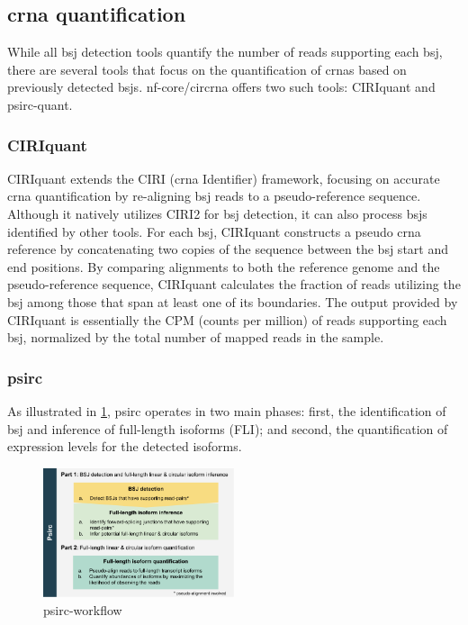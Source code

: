 \subsection{\gls{crna} quantification}
\label{sec:crna_quantification}

While all \gls{bsj} detection tools quantify the number of reads
supporting each \gls{bsj}, there are several tools that focus on the
quantification of \glspl{crna} based on previously detected \glspl{bsj}.
nf-core/circrna offers two such tools: CIRIquant and
psirc-quant.

\subsubsection{CIRIquant}
\label{sec:ciriquant}
CIRIquant extends the CIRI (\Gls{crna} Identifier) framework, focusing on
accurate \gls{crna} quantification by re-aligning \gls{bsj} reads to a
pseudo-reference sequence.
Although it natively utilizes CIRI2 for \gls{bsj} detection, it can also
process \glspl{bsj} identified by other tools\supercite{zhang_accurate_2020}.
For each \gls{bsj}, CIRIquant constructs a pseudo \gls{crna} reference by
concatenating two copies of the sequence between the \gls{bsj} start and end
positions.
By comparing alignments to both the reference genome and the pseudo-reference
sequence, CIRIquant calculates the fraction of reads utilizing the \gls{bsj}
among those that span at least one of its
boundaries\supercite{zhang_accurate_2020}.
The output provided by CIRIquant is essentially the CPM (counts per million) of
reads supporting each \gls{bsj}, normalized by the total number of mapped reads
in the sample.

\subsubsection{psirc}
\label{sec:psirc}
As illustrated in \cref{fig:psirc_workflow}, psirc operates in two main phases:
first, the identification of \gls{bsj} and inference of full-length isoforms
(FLI); and second, the quantification of expression levels for the detected
isoforms\supercite{yu_quantifying_2021}.

\begin{figure}[ht] \centering

    \includegraphics[width=0.5\textwidth]{chapters/3_materials_and_methods/figures/psirc_pipeline.png}
    \caption{psirc-workflow} \label{fig:psirc_workflow} \end{figure}

